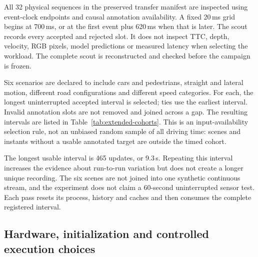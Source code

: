 All 32 physical sequences in the preserved transfer manifest are inspected using event-clock endpoints and causal annotation availability. A fixed 20\,ms grid begins at 700\,ms, or at the first event plus 620\,ms when that is later. The scout records every accepted and rejected slot. It does not inspect TTC, depth, velocity, RGB pixels, model predictions or measured latency when selecting the workload. The complete scout is reconstructed and checked before the campaign is frozen.

Six scenarios are declared to include cars and pedestrians, straight and lateral motion, different road configurations and different speed categories. For each, the longest uninterrupted accepted interval is selected; ties use the earliest interval. Invalid annotation slots are not removed and joined across a gap. The resulting intervals are listed in Table~\ref{tab:extended-cohorts}. This is an input-availability selection rule, not an unbiased random sample of all driving time: scenes and instants without a usable annotated target are outside the timed cohort.

\begin{table}[H]
\centering\footnotesize
\caption{\textbf{Distinct continuous sensor intervals.} Duration is the number of scheduled updates divided by 50; the last anchor is one period before the interval end. The same interval is replayed in each repetition.}
\label{tab:extended-cohorts}

\end{table}

The longest usable interval is 465 updates, or 9.3\,s. Repeating this interval increases the evidence about run-to-run variation but does not create a longer unique recording. The six scenes are not joined into one synthetic continuous stream, and the experiment does not claim a 60-second uninterrupted sensor test. Each pass resets its process, history and caches and then consumes the complete registered interval.

\begin{table}[H]
\centering\small
\caption{\textbf{Observed RAW workload.} Counts come from the feeder in the first PHASE small-queue pass, including acquired packets later dropped by the consumer queue. Event rate is averaged over the offered interval; the preload archive also contains initialization history and RGB frames.}

\end{table}

\subsection{Hardware, initialization and controlled execution choices}

